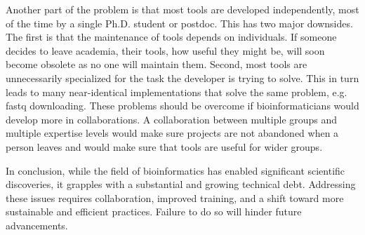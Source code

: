 Another part of the problem is that most tools are developed independently, most of the time by a single Ph.D. student or postdoc. This has two major downsides. The first is that the maintenance of tools depends on individuals. If someone decides to leave academia, their tools, how useful they might be, will soon become obsolete as no one will maintain them. Second, most tools are unnecessarily specialized for the task the developer is trying to solve. This in turn leads to many near-identical implementations that solve the same problem, e.g. fastq downloading. These problems should be overcome if bioinformaticians would develop more in collaborations. A collaboration between multiple groups and multiple expertise levels would make sure projects are not abandoned when a person leaves and would make sure that tools are useful for wider groups. 

In conclusion, while the field of bioinformatics has enabled significant scientific discoveries, it grapples with a substantial and growing technical debt. Addressing these issues requires collaboration, improved training, and a shift toward more sustainable and efficient practices. Failure to do so will hinder future advancements.
